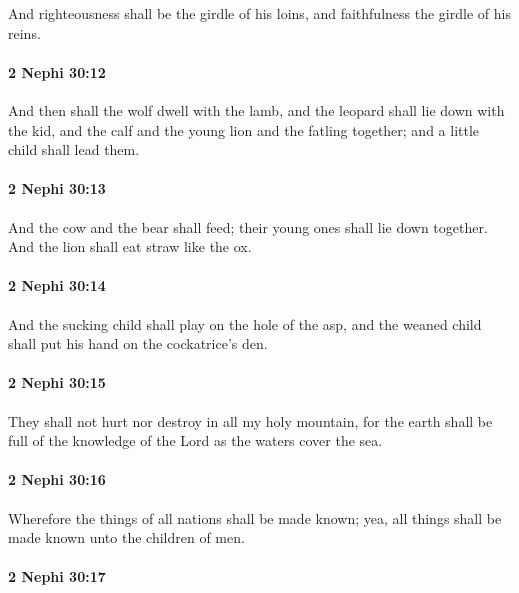 			And righteousness shall be the girdle of his loins,
			and faithfulness the girdle of his reins.

		\paragraph{2 Nephi 30:12} %
			\label{2NEPHI-30-12}

			And then shall the wolf dwell with the lamb,
			and the leopard shall lie down with the kid,
			and the calf and the young lion and the fatling together;
			and a little child shall lead them.

		\paragraph{2 Nephi 30:13} %
			\label{2NEPHI-30-13}

			And the cow and the bear shall feed;
			their young ones shall lie down together.
			And the lion shall eat straw like the ox.

		\paragraph{2 Nephi 30:14} %
			\label{2NEPHI-30-14}

			And the sucking child shall play on the hole of the asp,
			and the weaned child shall put his hand on the cockatrice's den.

		\paragraph{2 Nephi 30:15} %
			\label{2NEPHI-30-15}

			They shall not hurt nor destroy in all my holy mountain,
			for the earth shall be full of the knowledge of the Lord
			as the waters cover the sea.

		\paragraph{2 Nephi 30:16} %
			\label{2NEPHI-30-16}

			Wherefore the things of all nations shall be made known;
			yea, all things shall be made known unto the children of men.

		\paragraph{2 Nephi 30:17} %
			\label{2NEPHI-30-17}

